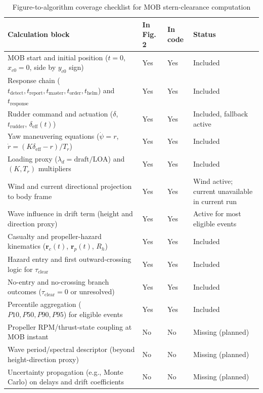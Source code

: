\documentclass[preprint,12pt]{elsarticle}
\begin{document}
\begin{table}[H]
\centering
\caption{Figure-to-algorithm coverage checklist for MOB stern-clearance computation}
\label{tab:model_coverage_checklist}
\begin{tabular}{p{}p{}p{}p{}}
    \toprule
Calculation block & In Fig. 2 & In code & Status \\
\midrule
MOB start and initial position ($t=0$, $x_{c0}=0$, side by $y_{c0}$ sign) & Yes & Yes & Included \\
Response chain ($t_{\mathrm{detect}},t_{\mathrm{report}},t_{\mathrm{master}},t_{\mathrm{order}},t_{\mathrm{helm}}$) and $t_{\mathrm{response}}$ & Yes & Yes & Included \\
Rudder command and actuation ($\delta$, $t_{\mathrm{rudder}}$, $\delta_{\mathrm{eff}}(t)$) & Yes & Yes & Included, fallback active \\
Yaw maneuvering equations ($\dot{\psi}=r$, $\dot{r}=(K\delta_{\mathrm{eff}}-r)/T_r$) & Yes & Yes & Included \\
Loading proxy ($\lambda_d=\mathrm{draft}/\mathrm{LOA}$) and $(K,T_r)$ multipliers & Yes & Yes & Included \\
Wind and current directional projection to body frame & Yes & Yes & Wind active; current unavailable in current run \\
Wave influence in drift term (height and direction proxy) & Yes & Yes & Active for most eligible events \\
Casualty and propeller-hazard kinematics ($\mathbf{r}_c(t)$, $\mathbf{r}_p(t)$, $R_h$) & Yes & Yes & Included \\
Hazard entry and first outward-crossing logic for $\tau_{\mathrm{clear}}$ & Yes & Yes & Included \\
No-entry and no-crossing branch outcomes ($\tau_{\mathrm{clear}}=0$ or unresolved) & Yes & Yes & Included \\
Percentile aggregation ($P10,P50,P90,P95$) for eligible events & Yes & Yes & Included \\
Propeller RPM/thrust-state coupling at MOB instant & No & No & Missing (planned) \\
Wave period/spectral descriptor (beyond height-direction proxy) & No & No & Missing (planned) \\
Uncertainty propagation (e.g., Monte Carlo) on delays and drift coefficients & No & No & Missing (planned) \\
\bottomrule
\end{tabular}
\end{table}
\end{document}

